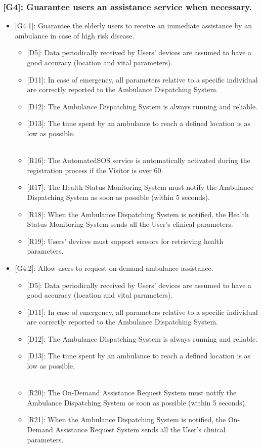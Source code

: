 \documentclass[12pt,a4paper]{article}
\begin{document}
	\subsubsection*{{[}{G4}{]}: Guarantee users an assistance service when necessary.}
		\begin{itemize}
			\item {[G4.1]}: Guarantee the elderly users to receive an immediate assistance by an ambulance in case of high risk disease.
			\begin{itemize}
				\item {[D5]}: Data periodically received by Users' devices are assumed to have a good accuracy (location and vital parameters).
				\item {[D11]}: In case of emergency, all parameters relative to a specific individual are correctly reported to the Ambulance Dispatching System.
				\item {[D12]}: The Ambulance Dispatching System is always running and reliable.
				\item {[D13]}: The time spent by an ambulance to reach a defined location is as low as possible.
				\\ \\
				\item {[R16]}: The AutomatedSOS service is automatically activated during the registration process if the Visitor is over 60.
				\item {[R17]}: The Health Status Monitoring System must notify the Ambulance Dispatching System as soon as possible (within 5 seconds).
				\item {[R18]}: When the Ambulance Dispatching System is notified, the Health Status Monitoring System sends all the User's clinical parameters.
				\item {[R19]}: Users' devices must support sensors for retrieving health parameters.
			\end{itemize}
			\item {[G4.2]}: Allow users to request on-demand ambulance assistance.
			\begin{itemize}
				\item {[D5]}: Data periodically received by Users' devices are assumed to have a good accuracy (location and vital parameters).
				\item {[D11]}: In case of emergency, all parameters relative to a specific individual are correctly reported to the Ambulance Dispatching System.
				\item {[D12]}: The Ambulance Dispatching System is always running and reliable.
				\item {[D13]}: The time spent by an ambulance to reach a defined location is as low as possible.
				\\ \\
				\item {[R20]}: The On-Demand Assistance Request System must notify the Ambulance Dispatching System as soon as possible (within 5 seconds).
				\item {[R21]}: When the Ambulance Dispatching System is notified, the On-Demand Assistance Request System sends all the User's clinical parameters.
			\end{itemize}
		\end{itemize}
	
\end{document}
